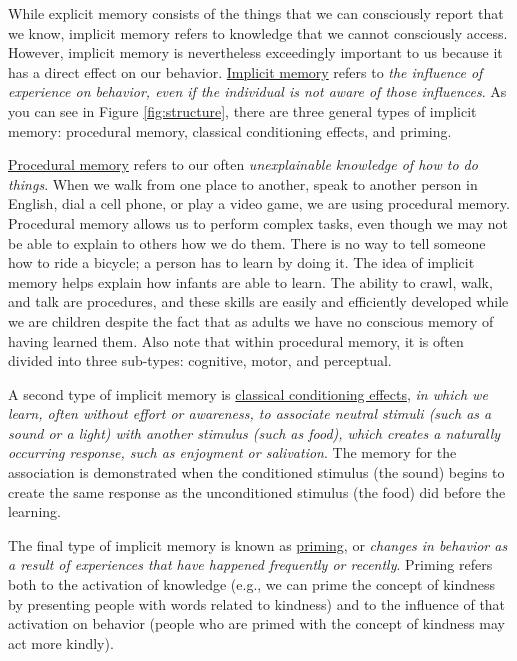 \documentclass[
]{krantz}
\begin{document}
While explicit memory consists of the things that we can consciously report that we know, implicit memory refers to knowledge that we cannot consciously access. However, implicit memory is nevertheless exceedingly important to us because it has a direct effect on our behavior. \hyperref[implicit-memory]{Implicit memory} refers to \emph{the influence of experience on behavior, even if the individual is not aware of those influences}. As you can see in Figure \ref{fig:structure}, there are three general types of implicit memory: procedural memory, classical conditioning effects, and priming.

\hyperref[procedural-memory]{Procedural memory} refers to our often \emph{unexplainable knowledge of how to do things}. When we walk from one place to another, speak to another person in English, dial a cell phone, or play a video game, we are using procedural memory. Procedural memory allows us to perform complex tasks, even though we may not be able to explain to others how we do them. There is no way to tell someone how to ride a bicycle; a person has to learn by doing it. The idea of implicit memory helps explain how infants are able to learn. The ability to crawl, walk, and talk are procedures, and these skills are easily and efficiently developed while we are children despite the fact that as adults we have no conscious memory of having learned them. Also note that within procedural memory, it is often divided into three sub-types: cognitive, motor, and perceptual.

A second type of implicit memory is \hyperref[classical-conditioning-effects]{classical conditioning effects}, \emph{in which we learn, often without effort or awareness, to associate neutral stimuli (such as a sound or a light) with another stimulus (such as food), which creates a naturally occurring response, such as enjoyment or salivation}. The memory for the association is demonstrated when the conditioned stimulus (the sound) begins to create the same response as the unconditioned stimulus (the food) did before the learning.

The final type of implicit memory is known as \hyperref[priming]{priming}, or \emph{changes in behavior as a result of experiences that have happened frequently or recently}. Priming refers both to the activation of knowledge (e.g., we can prime the concept of kindness by presenting people with words related to kindness) and to the influence of that activation on behavior (people who are primed with the concept of kindness may act more kindly).
\end{document}
